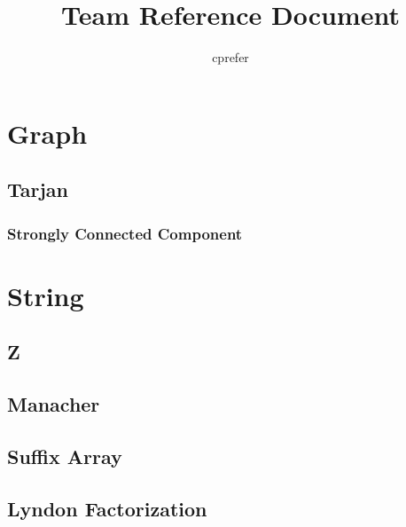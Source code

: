 \documentclass{article}
\begin{document}
\title{Team Reference Document}
\author{cprefer}
\maketitle
\newpage
\begin{multicols}{2}
    \tableofcontents

    \section{Graph}
    \subsection{Tarjan}
    \subsubsection{Strongly Connected Component}
    
    
    \section{String}
    \subsection{Z}
    
    \subsection{Manacher}
    
    \subsection{Suffix Array}
    
    \subsection{Lyndon Factorization}
    

\end{multicols}
\end{document}
